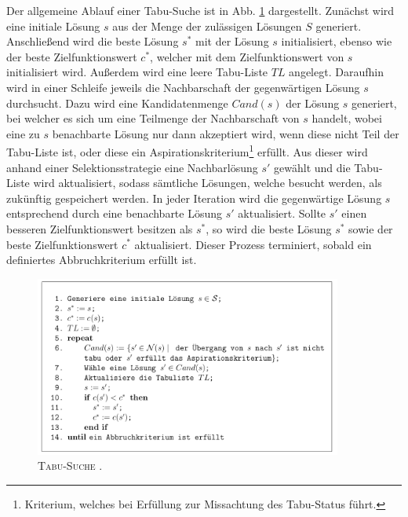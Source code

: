 Der allgemeine Ablauf einer Tabu-Suche ist in Abb. \ref{fig:tabu_search_algo}
dargestellt. Zunächst wird eine initiale Lösung $s$ aus der Menge der zulässigen Lösungen $S$ generiert.
Anschließend wird die beste Lösung $s^*$ mit der Lösung $s$ initialisiert, ebenso wie der beste Zielfunktionswert
$c^*$, welcher mit dem Zielfunktionswert von $s$ initialisiert wird. Außerdem wird eine leere Tabu-Liste $TL$
angelegt. Daraufhin wird in einer Schleife jeweils die Nachbarschaft der gegenwärtigen Lösung $s$ durchsucht. Dazu wird eine
Kandidatenmenge $Cand(s)$ der Lösung $s$ generiert, bei welcher es sich um eine Teilmenge der Nachbarschaft von $s$
handelt, wobei eine zu $s$ benachbarte Lösung nur dann akzeptiert wird, wenn diese nicht Teil der Tabu-Liste ist,
oder diese ein Aspirationskriterium\footnote{Kriterium, welches bei Erfüllung zur Missachtung des Tabu-Status führt.} erfüllt. Aus dieser wird anhand einer Selektionsstrategie eine Nachbarlösung $s'$ gewählt und die Tabu-Liste wird aktualisiert, sodass sämtliche Lösungen, welche besucht werden, als zukünftig  gespeichert werden. In jeder Iteration wird die gegenwärtige Lösung $s$ entsprechend durch eine benachbarte Lösung $s'$ aktualisiert.
Sollte $s'$ einen besseren Zielfunktionswert besitzen als $s^*$, so wird die beste Lösung $s^*$
sowie der beste Zielfunktionswert $c^*$ aktualisiert. Dieser Prozess terminiert, sobald ein definiertes
Abbruchkriterium erfüllt ist.

\begin{figure}[H]
\centering
\includegraphics[width=0.9\textwidth]{img/tabu_search_algo_placeholder.png}
\caption{\textsc{Tabu-Suche \cite{Knust2017}.}}
\label{fig:tabu_search_algo}
\end{figure}

